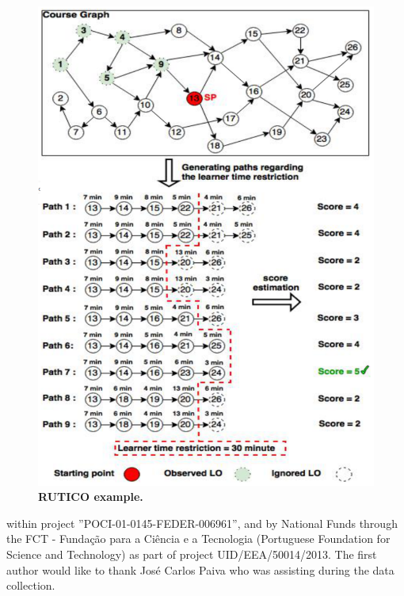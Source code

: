 \documentclass{sig-alternate}
\begin{document}
\begin{figure}[t]
    \centering
    \includegraphics[width=0.8\linewidth]{images/figure7.png}
    \caption{\textbf{RUTICO example.}}
    \label{fig:f7}
\end{figure}

\noindent within project ”POCI-01-0145-FEDER-006961”, and by National Funds through the FCT - Fundação para a Ciência e a Tecnologia (Portuguese Foundation for Science and Technology) as part of project UID/EEA/50014/2013. The first author would like to thank José Carlos Paiva who was assisting during the data collection.


\balancecolumns
\end{document}
